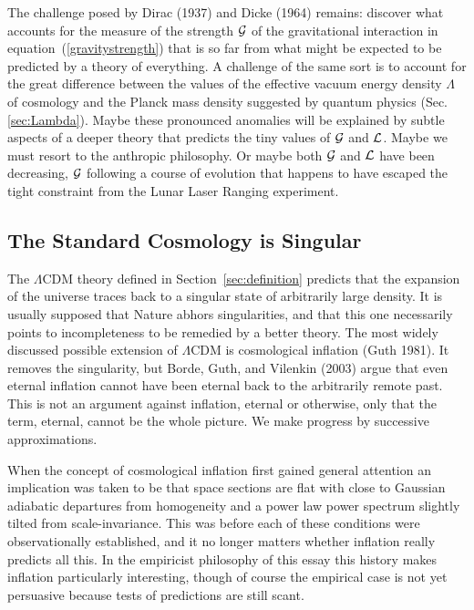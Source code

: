 \documentclass[fleqn,12pt]{article}
\begin{document}
The challenge posed by Dirac (1937) and Dicke (1964) remains: discover what accounts for the measure of the strength ${\cal G}$ of the gravitational interaction in equation~(\ref{gravitystrength}) that is so far from what might be expected to be predicted by a theory of everything. A challenge of the same sort is to account for the great difference between the values of the effective vacuum energy density $\Lambda$ of cosmology and the Planck mass density suggested by quantum physics (Sec.\ref{sec:Lambda}). Maybe these  pronounced anomalies will be explained by subtle aspects of a deeper theory that predicts the tiny values of ${\cal G}$ and $\cal L$. Maybe we must resort to the anthropic philosophy. Or maybe both ${\cal G}$ and $\cal L$ have been decreasing, ${\cal G}$ following a course of evolution that happens to have escaped the tight constraint from the Lunar Laser Ranging experiment. 

\subsection{The Standard Cosmology is Singular}

The $\Lambda$CDM theory defined in Section~\ref{sec:definition} predicts that the expansion of the universe traces back to a singular state of arbitrarily large density. It is usually supposed that Nature abhors singularities, and that this one necessarily points to incompleteness to be remedied by a better theory. The most widely discussed possible extension of $\Lambda$CDM is cosmological inflation (Guth 1981). It removes the singularity, but Borde, Guth, and Vilenkin (2003) argue that even eternal inflation cannot have been eternal back to the arbitrarily remote past. This is not an argument against inflation, eternal or otherwise, only that the term, eternal, cannot be the whole picture. We make progress by successive approximations.

When the concept of cosmological inflation first gained general attention an  implication was taken to be that space sections are flat with close to Gaussian adiabatic departures from homogeneity and a power law power spectrum slightly tilted from scale-invariance. This was before each of these conditions were  observationally established, and it no longer matters whether inflation really predicts all this. In the empiricist philosophy of this essay this history makes inflation particularly interesting, though of course the empirical case is not yet persuasive because tests of predictions are still scant.
\end{document}
